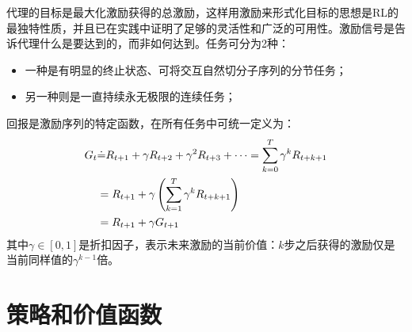 \documentclass{ctexart}
\begin{document}
代理的目标是最大化激励获得的总激励，这样用激励来形式化目标的思想是RL的最独特性质，并且已在实践中证明了足够的灵活性和广泛的可用性。激励信号是告诉代理什么是要达到的，而非如何达到。任务可分为2种：
\begin{itemize}
    \item 一种是有明显的终止状态、可将交互自然切分子序列的分节任务；
    \item 另一种则是一直持续永无极限的连续任务；
\end{itemize}
回报是激励序列的特定函数，在所有任务中可统一定义为：
\begin{align}
    G_t &\dot= R_{t+1} + \gamma R_{t+2} + \gamma^2 R_{t+3} + \cdots = \sum_{k=0}^T \gamma^k R_{t+k+1} \\
        &= R_{t+1} + \gamma\left( \sum_{k=1}^T\gamma^kR_{t+k+1} \right) \notag \\
        &= R_{t+1} + \gamma G_{t+1}
\end{align}
其中$\gamma \in [0,1]$是折扣因子，表示未来激励的当前价值：$k$步之后获得的激励仅是当前同样值的$\gamma^{k-1}$倍。

\section{策略和价值函数}
\end{document}
